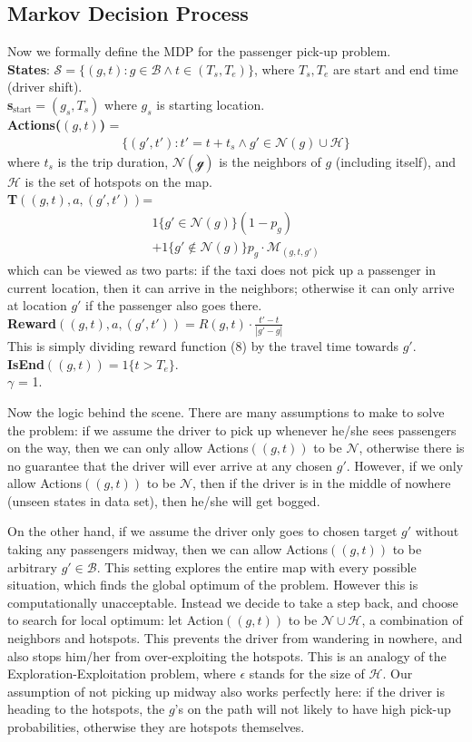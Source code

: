 \documentclass[letterpaper, 10 pt, conference]{ieeeconf}
\begin{document}
\subsection{Markov Decision Process}
Now we formally define the MDP for the passenger pick-up problem.\\
\textbf{States}: $\mathcal{S} = \{(g, t): g\in\mathcal{B}\wedge t\in(T_s, T_e)\}$, where $T_s, T_e$ are start and end time (driver shift).\\
\textbf{s$_{\text{start}}$}$=(g_s, T_s)$ where $g_s$ is starting location.\\
\textbf{Actions($(g, t)$)} =
\begin{align}
\{(g', t'):t'= t+t_s\wedge g'\in\mathcal{N}(g)\cup\mathcal{H}\}
\end{align}
where $t_s$ is the trip duration, $\mathcal{N(g)}$ is the neighbors of $g$ (including itself), and $\mathcal{H}$ is the set of hotspots on the map.\\
\textbf{T$((g,t), a, (g',t'))$}=
\begin{align}
1\{g'\in\mathcal{N}(g)\}(1-p_g)\\
+1\{g'\not\in\mathcal{N}(g)\}p_g\cdot\mathcal{M}_{(g,t,g')}
\end{align}
which can be viewed as two parts: if the taxi does not pick up a passenger in current location, then it can arrive in the neighbors; otherwise it can only arrive at location $g'$ if the passenger also goes there.\\
\textbf{Reward}$((g,t), a, (g',t'))=R(g,t)\cdot\frac{t'-t}{|g'-g|}$\\
This is simply dividing reward function (8) by the travel time towards $g'$.\\
\textbf{IsEnd}$((g,t))=1\{t>T_e\}$.\\
\textbf{$\gamma$} = 1.


Now the logic behind the scene. There are many assumptions to make to solve the problem: if we assume the driver to pick up whenever he/she sees passengers on the way, then we can only allow Actions$((g,t))$ to be $\mathcal{N}$, otherwise there is no guarantee that the driver will ever arrive at any chosen $g'$. However, if we only allow Actions$((g,t))$ to be $\mathcal{N}$, then if the driver is in the middle of nowhere (unseen states in data set), then he/she will get bogged. 

On the other hand, if we assume the driver only goes to chosen target $g'$ without taking any passengers midway, then we can allow Actions$((g,t))$ to be arbitrary $g'\in\mathcal{B}$. This setting explores the entire map with every possible situation, which finds the global optimum of the problem. However this is computationally unacceptable. Instead we decide to take a step back, and choose to search for local optimum: let Action$((g,t))$ to be $\mathcal{N}\cup\mathcal{H}$, a combination of neighbors and hotspots. This prevents the driver from wandering in nowhere, and also stops him/her from over-exploiting the hotspots. This is an analogy of the Exploration-Exploitation problem, where $\epsilon$ stands for the size of $\mathcal{H}$. Our assumption of not picking up midway also works perfectly here: if the driver is heading to the hotspots, the $g$'s on the path will not likely to have high pick-up probabilities, otherwise they are hotspots themselves.
\end{document}
